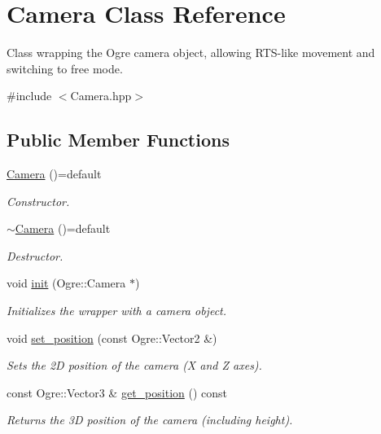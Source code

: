 \hypertarget{class_camera}{}\section{Camera Class Reference}
\label{class_camera}


Class wrapping the Ogre camera object, allowing R\+T\+S-\/like movement and switching to free mode.  




{\ttfamily \#include $<$Camera.\+hpp$>$}

\subsection*{Public Member Functions}
\begin{DoxyCompactItemize}
\item 
\hyperlink{class_camera_ae23af4d7cab430c77d537621cdd16b3f}{Camera} ()=default
\begin{DoxyCompactList}\small\item\em Constructor. \end{DoxyCompactList}\item 
\hyperlink{class_camera_adcb96efefa7af58e3ee6534b15d4979b}{$\sim$\+Camera} ()=default
\begin{DoxyCompactList}\small\item\em Destructor. \end{DoxyCompactList}\item 
void \hyperlink{class_camera_a8e44e7aa45c25d149c64df40f6b67d44}{init} (Ogre\+::\+Camera $\ast$)
\begin{DoxyCompactList}\small\item\em Initializes the wrapper with a camera object. \end{DoxyCompactList}\item 
void \hyperlink{class_camera_a7ec17fe707671c1cb7ca4c0625708774}{set\+\_\+position} (const Ogre\+::\+Vector2 \&)
\begin{DoxyCompactList}\small\item\em Sets the 2D position of the camera (X and Z axes). \end{DoxyCompactList}\item 
const Ogre\+::\+Vector3 \& \hyperlink{class_camera_a3738ea5dd3673a13f54cfb7d1e605ce9}{get\+\_\+position} () const 
\begin{DoxyCompactList}\small\item\em Returns the 3D position of the camera (including height). \end{DoxyCompactList}\item 

\end{DoxyCompactItemize}
